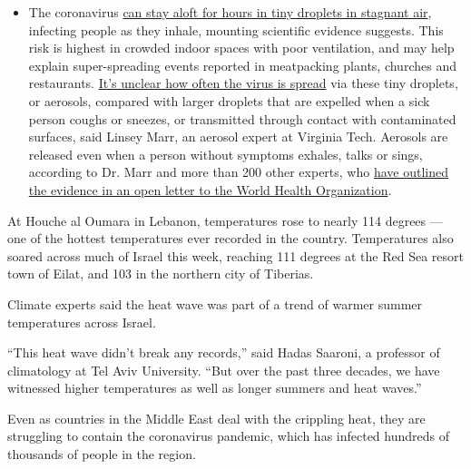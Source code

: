 \begin{itemize}
  \begin{itemize}
  \tightlist
  \item
    The coronavirus
    \href{https://www.nytimes.com/2020/07/04/health/239-experts-with-one-big-claim-the-coronavirus-is-airborne.html?action=click\&pgtype=Article\&state=default\&region=MAIN_CONTENT_3\&context=storylines_faq}{can
    stay aloft for hours in tiny droplets in stagnant air}, infecting
    people as they inhale, mounting scientific evidence suggests. This
    risk is highest in crowded indoor spaces with poor ventilation, and
    may help explain super-spreading events reported in meatpacking
    plants, churches and restaurants.
    \href{https://www.nytimes.com/2020/07/06/health/coronavirus-airborne-aerosols.html?action=click\&pgtype=Article\&state=default\&region=MAIN_CONTENT_3\&context=storylines_faq}{It's
    unclear how often the virus is spread} via these tiny droplets, or
    aerosols, compared with larger droplets that are expelled when a
    sick person coughs or sneezes, or transmitted through contact with
    contaminated surfaces, said Linsey Marr, an aerosol expert at
    Virginia Tech. Aerosols are released even when a person without
    symptoms exhales, talks or sings, according to Dr. Marr and more
    than 200 other experts, who
    \href{https://academic.oup.com/cid/article/doi/10.1093/cid/ciaa939/5867798}{have
    outlined the evidence in an open letter to the World Health
    Organization}.
  \end{itemize}
\end{itemize}

At Houche al Oumara in Lebanon, temperatures rose to nearly 114 degrees
--- one of the hottest temperatures ever recorded in the country.
Temperatures also soared across much of Israel this week, reaching 111
degrees at the Red Sea resort town of Eilat, and 103 in the northern
city of Tiberias.

Climate experts said the heat wave was part of a trend of warmer summer
temperatures across Israel.

``This heat wave didn't break any records,'' said Hadas Saaroni, a
professor of climatology at Tel Aviv University. ``But over the past
three decades, we have witnessed higher temperatures as well as longer
summers and heat waves.''

Even as countries in the Middle East deal with the crippling heat, they
are struggling to contain the coronavirus pandemic, which has infected
hundreds of thousands of people in the region.

